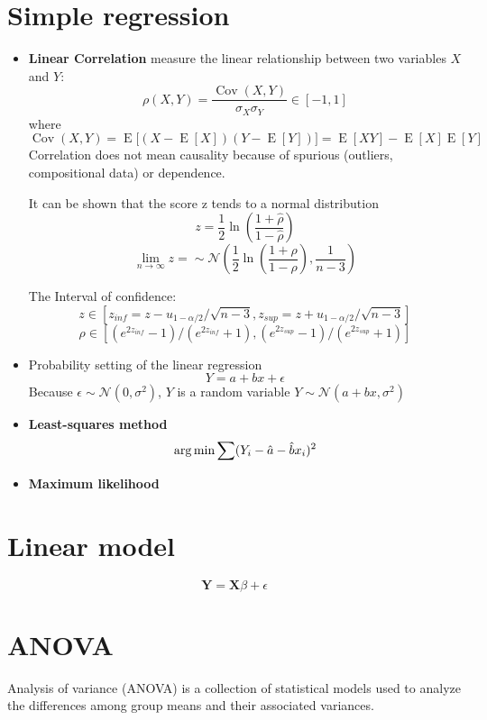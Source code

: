 \documentclass[twocolumn]{article}
\numberwithin{equation}{section}
\begin{document}
\section{Simple regression}
\begin{itemize}
	\item \textbf{Linear Correlation} measure the linear relationship between two variables $X$ and $Y$:
$$ \rho(X,Y) = \frac{\operatorname{Cov}(X,Y)}{\sigma_X \sigma_Y} \in [ -1,1]$$
where $\operatorname{Cov}(X,Y) = \operatorname{E}{\big[(X - \operatorname{E}[X])(Y - \operatorname{E}[Y])\big]} = \operatorname{E}\left[X Y\right] - \operatorname{E}\left[X\right] \operatorname{E}\left[Y\right]$
Correlation does not mean causality because of spurious (outliers, compositional data) or dependence. 

It can be shown that the score z tends to a normal distribution
$$z = \frac{1}{2} \ln \left( \frac{1+\hat{\rho}}{1-\hat{\rho}}\right)$$
$$ \lim_{n \rightarrow \infty } z = \sim \mathcal{N}\left( \frac{1}{2} \ln \left( \frac{1+\rho}{1-\rho}\right), \frac{1}{n-3}\right) $$

The Interval of confidence:
$$ z \in [z_{inf}=z-u_{1-\alpha/2}/\sqrt{n-3}, z_{sup}=z+u_{1-\alpha/2}/\sqrt{n-3}] $$
$$ \rho \in [(e^{2z_{inf}}-1)/(e^{2z_{inf}}+1) , (e^{2z_{sup}}-1)/(e^{2z_{sup}}+1)] $$

	\item Probability setting of the linear regression
$$ Y = a + bx + \epsilon $$
Because $\epsilon \sim \mathcal{N}(0,\sigma^2)$, $Y$ is a random variable $Y \sim \mathcal{N}(a+bx,\sigma^2)$

	\item \textbf{Least-squares method}
$$ {\rm arg}\min \sum( Y_i - \hat{a} - \hat{b}x_i)^2$$
	
	\item \textbf{Maximum likelihood}
\end{itemize}


\section{Linear model}
$$ \textbf{Y} = \textbf{X}\beta + \epsilon $$

\section{ANOVA}
Analysis of variance (ANOVA) is a collection of statistical models used to analyze the differences among group means and their associated variances. 
\end{document}
